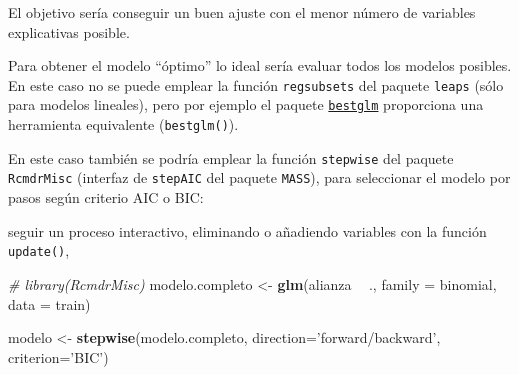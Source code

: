 \documentclass[
]{book}
\newenvironment{Shaded}{\begin{snugshade}}{\end{snugshade}}
\newcommand{\CommentTok}[1]{\textcolor[rgb]{0.56,0.35,0.01}{\textit{#1}}}
\newcommand{\DataTypeTok}[1]{\textcolor[rgb]{0.13,0.29,0.53}{#1}}
\newcommand{\KeywordTok}[1]{\textcolor[rgb]{0.13,0.29,0.53}{\textbf{#1}}}
\newcommand{\NormalTok}[1]{#1}
\newcommand{\OperatorTok}[1]{\textcolor[rgb]{0.81,0.36,0.00}{\textbf{#1}}}
\newcommand{\StringTok}[1]{\textcolor[rgb]{0.31,0.60,0.02}{#1}}
\theoremstyle{break}
\theoremstyle{definition}
\theoremstyle{definition}
\theoremstyle{definition}
\theoremstyle{remark}
\begin{document}
El objetivo sería conseguir un buen ajuste con el menor número de variables explicativas posible.

Para obtener el modelo ``óptimo'' lo ideal sería evaluar todos los modelos posibles.
En este caso no se puede emplear la función \texttt{regsubsets} del paquete \texttt{leaps} (sólo para modelos lineales),
pero por ejemplo el paquete
\href{https://cran.r-project.org/web/packages/bestglm/vignettes/bestglm.pdf}{\texttt{bestglm}}
proporciona una herramienta equivalente (\texttt{bestglm()}).

En este caso también se podría emplear la función \texttt{stepwise} del paquete \texttt{RcmdrMisc} (interfaz de \texttt{stepAIC} del paquete \texttt{MASS}), para seleccionar el modelo por pasos según criterio AIC o BIC:

seguir un proceso interactivo, eliminando o añadiendo variables con la función \texttt{update()},

\begin{Shaded}
\begin{Highlighting}[]
\CommentTok{# library(RcmdrMisc)}
\NormalTok{modelo.completo <-}\StringTok{ }\KeywordTok{glm}\NormalTok{(alianza }\OperatorTok{~}\StringTok{ }\NormalTok{., }\DataTypeTok{family =}\NormalTok{ binomial, }\DataTypeTok{data =}\NormalTok{ train)}

\NormalTok{modelo <-}\StringTok{ }\KeywordTok{stepwise}\NormalTok{(modelo.completo, }\DataTypeTok{direction=}\StringTok{'forward/backward'}\NormalTok{, }\DataTypeTok{criterion=}\StringTok{'BIC'}\NormalTok{)}
\end{Highlighting}
\end{Shaded}
\end{document}
